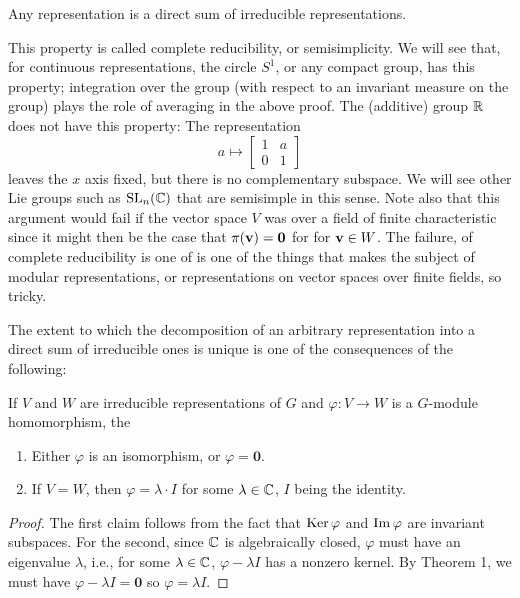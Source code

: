 \begin{corollary}
  Any representation is a direct sum of irreducible representations.
\end{corollary}

This property is called complete reducibility, or semisimplicity. We will
see that, for continuous representations, the circle $S^1$, or any compact
group, has this property; integration over the group (with respect to an
invariant measure on the group) plays the role of averaging in the above
proof. The (additive) group $\mathbb{R}$ does not have this property: The
representation
\[
  a\longmapsto
  \begin{bmatrix}
    1&a\\0&1
  \end{bmatrix}
\]
leaves the $x$ axis fixed, but there is no complementary subspace. We will
see other Lie groups such as $\mathrm{SL}_n(\mathbb{C})$ that are semisimple in this
sense. Note also that this argument would fail if the vector space $V$ was
over a field of finite characteristic since it might then be the case that
$\pi(\mathbf{v})=\mathbf{0}$ for for $\mathbf{v}\in W$. The failure, of complete
reducibility is one  of is one of the things that makes the subject of
modular representations, or representations on vector spaces over finite
fields, so tricky.

The extent to which the decomposition of an arbitrary representation into a
direct sum of irreducible ones is unique is one of the consequences of the
following:

\begin{theorem}
  If $V$ and $W$ are irreducible representations of $G$ and $\varphi\colon
  V\to W$ is a $G$-module homomorphism, the
  \begin{enumerate}[label=\textnormal{(\alph*)},noitemsep]
  \item Either $\varphi$ is an isomorphism, or $\varphi=\mathbf{0}$.
  \item If $V=W$, then $\varphi=\lambda\cdot I$ for some $\lambda\in\mathbb{C}$,
    $I$ being the identity.
  \end{enumerate}
\end{theorem}
\begin{proof}
  The first claim follows from the fact that $\operatorname{Ker}\varphi$ and
  $\operatorname{Im}\varphi$ are invariant subspaces. For the second, since $\mathbb{C}$ is
  algebraically closed, $\varphi$ must have an eigenvalue $\lambda$, i.e.,
  for some $\lambda\in\mathbb{C}$, $\varphi-\lambda I$ has a nonzero kernel. By
  Theorem 1, we must have $\varphi-\lambda I=\mathbf{0}$ so $\varphi=\lambda I$.
\end{proof}

